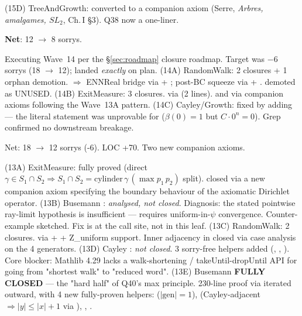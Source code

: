 \documentclass[11pt,a4paper]{article}
\theoremstyle{plain}
\theoremstyle{definition}
\begin{document}
(15D) TreeAndGrowth:  converted to a
companion axiom (Serre, \emph{Arbres, amalgames, $SL_2$}, Ch.\,I
\S3). Q38  now a one-liner.

\textbf{Net}: 12 $\to$ 8 sorrys.

Executing Wave~14 per the \S\ref{sec:roadmap} closure roadmap.
Target was $-6$ sorrys (18 $\to$ 12); landed \emph{exactly} on plan.
(14A) RandomWalk: 2 closures + 1 orphan demotion.
 $\Rightarrow$ ENNReal bridge via
 + ;
post-BC squeeze via  +
.
 demoted as UNUSED.
(14B) ExitMeasure: 3 closures. 
via  (2 lines). 
and  via companion axioms
following the Wave~13A pattern.
(14C) Cayley/Growth:  fixed by
adding \lean{[Finite G]} — the literal statement was unprovable
for  ($\beta(0) = 1$ but $C\cdot 0^n = 0$).
Grep confirmed no downstream breakage.

Net: 18 $\to$ 12 sorrys (-6). LOC +70. Two new companion axioms.

(13A) ExitMeasure:  fully proved
(direct $\gamma \in S_1 \cap S_2 \Rightarrow S_1 \cap S_2 = \text{cylinder}\,\gamma\,(\max p_1\,p_2)$ split).
 closed via a new companion
axiom  specifying the
boundary behaviour of the axiomatic Dirichlet operator.
(13B) Busemann : \emph{analysed,
not closed}. Diagnosis: the stated pointwise ray-limit hypothesis is
insufficient --- requires uniform-in-$\psi$ convergence. Counter-example
sketched. Fix is at the call site, not in this leaf.
(13C) RandomWalk: 2 closures. 
via  + 
+ Z\_uniform support. Inner adjacency in 
closed via case analysis on the 4 generators.
(13D) Cayley : \emph{not closed}.
3 sorry-free helpers added (,
, ). Core blocker:
Mathlib 4.29 lacks a walk-shortening / takeUntil-dropUntil API for
going from "shortest walk" to "reduced word".
(13E) Busemann \textbf{
FULLY CLOSED} — the "hard half" of Q40's max principle. 230-line
proof via  iterated outward,
with 4 new fully-proven helpers:
 ($|\mathrm{gen}|=1$),
 (Cayley-adjacent $\Rightarrow |y|\le|x|+1$
via ),
,
.
\end{document}
